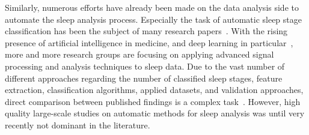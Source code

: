 Similarly, numerous efforts have already been made on the data analysis side to automate the sleep analysis process.
Especially the task of automatic sleep stage classification has been the subject of many research papers~\cite{Sen2014}.
With the rising presence of artificial intelligence in medicine, and deep learning in particular~\cite{LeCun2015, Yu2018, He2019}, more and more research groups are focusing on applying advanced signal processing and analysis techniques to sleep data.
Due to the vast number of different approaches regarding the number of classified sleep stages, feature extraction, classification algorithms, applied datasets, and validation approaches, direct comparison between published findings is a complex task~\cite{Ronzhina2012, Sen2014, Radha2014, Aboalayon2016, Boostani2017}.
However, high quality large-scale studies on automatic methods for sleep analysis was until very recently not dominant in the literature.





